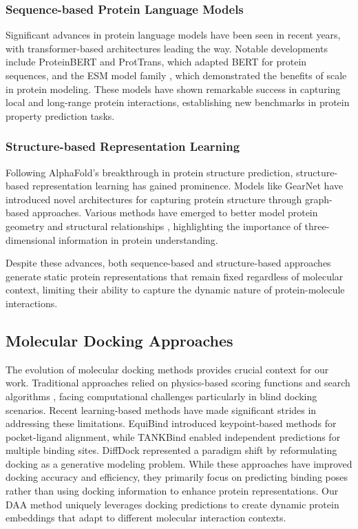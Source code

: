 \documentclass[sigconf]{acmart}
\begin{document}
\subsubsection{Sequence-based Protein Language Models}
Significant advances in protein language models have been seen in recent years, with transformer-based architectures\cite{Vaswani2017} leading the way. Notable developments include ProteinBERT \cite{brandes2021proteinbert} and ProtTrans\cite{elnaggar2021prottrans}, which adapted BERT\cite{devlin2018bert} for protein sequences, and the ESM model family \cite{hayes2024simulating, lin2023evolutionary, rives2021biological}, which demonstrated the benefits of scale in protein modeling. These models have shown remarkable success in capturing local and long-range protein interactions, establishing new benchmarks in protein property prediction tasks.

\subsubsection{Structure-based Representation Learning}
Following AlphaFold's \cite{jumper2021highly} breakthrough in protein structure prediction, structure-based representation learning has gained prominence. Models like GearNet \cite{zhang2023protein} have introduced novel architectures for capturing protein structure through graph-based approaches. Various methods have emerged to better model protein geometry and structural relationships \cite{fan2023continuous, hermosilla2020intrinsic, jing2020learning}, highlighting the importance of three-dimensional information in protein understanding.

Despite these advances, both sequence-based and structure-based approaches generate static protein representations that remain fixed regardless of molecular context, limiting their ability to capture the dynamic nature of protein-molecule interactions.

\subsection{Molecular Docking Approaches}
The evolution of molecular docking methods provides crucial context for our work. Traditional approaches relied on physics-based scoring functions and search algorithms \cite{McNutt2021,Stark2022}, facing computational challenges particularly in blind docking scenarios. Recent learning-based methods have made significant strides in addressing these limitations. EquiBind \cite{stark2022equibind} introduced keypoint-based methods for pocket-ligand alignment, while TANKBind \cite{lu2022tankbind} enabled independent predictions for multiple binding sites. DiffDock \cite{DiffDock2023} represented a paradigm shift by reformulating docking as a generative modeling problem. While these approaches have improved docking accuracy and efficiency, they primarily focus on predicting binding poses rather than using docking information to enhance protein representations. Our DAA method uniquely leverages docking predictions to create dynamic protein embeddings that adapt to different molecular interaction contexts.
\end{document}
